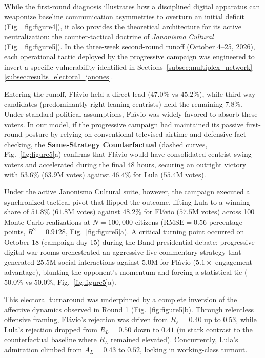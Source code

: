 \documentclass{article}
\begin{document}
While the first-round diagnosis illustrates how a disciplined digital apparatus can weaponize baseline communication asymmetries to overturn an initial deficit (Fig.~\ref{fig:figure4}), it also provides the theoretical architecture for its active neutralization: the counter-tactical doctrine of \emph{Janonismo Cultural} \citep{janones2023janonismo} (Fig.~\ref{fig:figure5}). In the three-week second-round runoff (October 4--25, 2026), each operational tactic deployed by the progressive campaign was engineered to invert a specific vulnerability identified in Sections~\ref{subsec:multiplex_network}--\ref{subsec:results_electoral_janones}.

Entering the runoff, Fl{\'a}vio held a direct lead ($47.0\%$ vs $45.2\%$), while third-way candidates (predominantly right-leaning centrists) held the remaining $7.8\%$. Under standard political assumptions, Fl{\'a}vio was widely favored to absorb these voters. In our model, if the progressive campaign had maintained its passive first-round posture by relying on conventional televised airtime and defensive fact-checking, the \textbf{Same-Strategy Counterfactual} (dashed curves, Fig.~\ref{fig:figure5}a) confirms that Fl{\'a}vio would have consolidated centrist swing voters and accelerated during the final 48 hours, securing an outright victory with $53.6\%$ ($63.9\mathrm{M}$ votes) against $46.4\%$ for Lula ($55.4\mathrm{M}$ votes).

Under the active Janonismo Cultural suite, however, the campaign executed a synchronized tactical pivot that flipped the outcome, lifting Lula to a winning share of $51.8\%$ ($61.8\mathrm{M}$ votes) against $48.2\%$ for Fl{\'a}vio ($57.5\mathrm{M}$ votes) across 100 Monte Carlo realizations at $N = 100{,}000$ citizens ($\mathrm{RMSE} = 0.56$ percentage points, $R^2 = 0.9128$, Fig.~\ref{fig:figure5}a). A critical turning point occurred on October 18 (campaign day 15) during the Band presidential debate: progressive digital war-rooms orchestrated an aggressive live commentary strategy that generated $25.5\mathrm{M}$ social interactions against $5.0\mathrm{M}$ for Fl{\'a}vio ($5.1\times$ engagement advantage), blunting the opponent's momentum and forcing a statistical tie ($50.0\%$ vs $50.0\%$, Fig.~\ref{fig:figure5}a).

This electoral turnaround was underpinned by a complete inversion of the affective dynamics observed in Round 1 (Fig.~\ref{fig:figure5}b). Through relentless offensive framing, Fl{\'a}vio's rejection was driven from $\bar{R}_F = 0.40$ up to $0.53$, while Lula's rejection dropped from $\bar{R}_L = 0.50$ down to $0.41$ (in stark contrast to the counterfactual baseline where $\bar{R}_L$ remained elevated). Concurrently, Lula's admiration climbed from $\bar{A}_L = 0.43$ to $0.52$, locking in working-class turnout.
\end{document}
